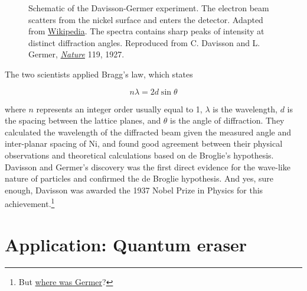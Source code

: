 \begin{figure}[!h]
	\centering
	\caption{\protect{} Schematic of the Davisson-Germer experiment. 
	The electron beam scatters from the nickel surface and enters the detector. 
	Adapted from \href{https://en.wikipedia.org/wiki/Davisson\%E2\%80\%93Germer\_experiment}{Wikipedia}. 
	\protect{} The spectra contains sharp peaks of intensity at distinct diffraction angles. 
	Reproduced from C. Davisson and L. Germer, \href{https://www.nature.com/nature/journal/v119/n2998/pdf/119558a0.pdf}{\emph{Nature}} 119, 1927.}
	\label{fig:DG}
\end{figure}

The two scientists applied Bragg's law, which states 

\begin{tcolorbox}[title=Bragg's law] \vspace{-2ex}
	\begin{equation}
		n\lambda = 2d\sin\theta \label{eq:bragg}
	\end{equation}
\end{tcolorbox}

\noindent where $n$ represents an integer order usually equal to 1, $\lambda$ is the wavelength, $d$ is the spacing between the lattice planes, and $\theta$ is the angle of diffraction. 
They calculated the wavelength of the diffracted beam given the measured angle and inter-planar spacing of Ni, and found good agreement between their physical observations and theoretical calculations based on de Broglie's hypothesis. 
Davisson and Germer's discovery was the first direct evidence for the wave-like nature of particles and confirmed the de Broglie hypothesis. 
And yes, sure enough, Davisson was awarded the 1937 Nobel Prize in Physics for this achievement.\footnote{But \href{http://www.nobelprize.org/nobel\_prizes/physics/laureates/1937/press.html}{where was Germer}?}


\section{Application: Quantum eraser}   \label{sec:eraser}


